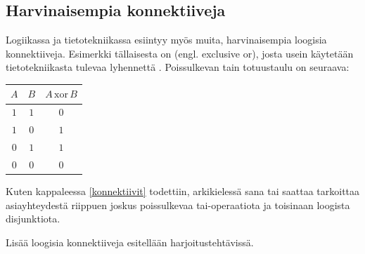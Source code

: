 \subsection*{Harvinaisempia konnektiiveja}%
Logiikassa ja tietotekniikassa esiintyy myös muita, harvinaisempia loogisia konnektiiveja. Esimerkki tällaisesta on  (engl. exclusive or), josta usein käytetään tietotekniikasta tulevaa lyhennettä . Poissulkevan tain totuustaulu on seuraava:

\bigskip

\begin{center}
\begin{tabular}{|c|c|c|}\hline
$A$ & $B$ & $A\,\mathrm{xor}\,B$ \\ \hline
$1$ & $1$ & $0$\\ %
$1$ & $0$ & $1$\\
$0$ & $1$ & $1$\\
$0$ & $0$ & $0$\\ \hline
\end{tabular}
\end{center}

\bigskip

Kuten kappaleessa \ref{konnektiivit} todettiin, arkikielessä sana tai saattaa tarkoittaa asiayhteydestä riippuen joskus poissulkevaa tai-operaatiota ja toisinaan loogista disjunktiota.

Lisää loogisia konnektiiveja esitellään harjoitustehtävissä.




\Harjoitustehtavat

